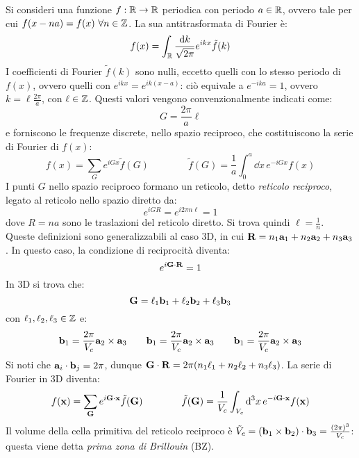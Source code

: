 Si consideri una funzione $ f : \mathbb{R} \rightarrow \mathbb{R} $ periodica con periodo $ a \in \mathbb{R} $, ovvero tale per cui $ f(x -na) = f(x) \,\,\forall n \in \mathbb{Z} $. La sua antitrasformata di Fourier è:
\begin{equation}
	f(x) = \int_{\mathbb{R}} \frac{\mathrm{d} k}{\sqrt{2\pi}} e^{ikx} \tilde{f}(k)
\end{equation}
I coefficienti di Fourier $ \tilde{f}(k) $ sono nulli, eccetto quelli con lo stesso periodo di $ f(x) $, ovvero quelli con $ e^{ikx} = e^{ik(x-a)} $: ciò equivale a $ e^{-ika} = 1 $, ovvero $ k = \ell \frac{2\pi}{a} $, con $ \ell \in \mathbb{Z} $. Questi valori vengono convenzionalmente indicati come:
\begin{equation}
	G = \frac{2\pi}{a} \ell
\end{equation}
e forniscono le frequenze discrete, nello spazio reciproco, che costituiscono la serie di Fourier di $ f(x) $:
\begin{equation}
	f(x) = \sum_G e^{iGx} \tilde{f}(G)
	\qquad \qquad
	\tilde{f}(G) = \frac{1}{a} \int_0^a \dd x\, e^{-i G x} f(x)
\end{equation}
I punti $ G $ nello spazio reciproco formano un reticolo, detto \textit{reticolo reciproco}, legato al reticolo nello spazio diretto da:
\begin{equation}
	e^{i G R} = e^{i 2\pi n \ell} = 1
\end{equation}
dove $ R = na $ sono le traslazioni del reticolo diretto. Si trova quindi $ \ell = \frac{1}{n} $. \\
Queste definizioni sono generalizzabili al caso 3D, in cui $ \mathbf{R} = n_1 \mathbf{a}_1 + n_2 \mathbf{a}_2 + n_3 \mathbf{a}_3 $. In questo caso, la condizione di reciprocità diventa:
\begin{equation}
	e^{i \mathbf{G} \cdot \mathbf{R}} = 1
	\label{eq:rec-ret}
\end{equation}
In 3D si trova che:
\begin{equation}
	\mathbf{G} = \ell_1 \mathbf{b}_1 + \ell_2 \mathbf{b}_2 + \ell_3 \mathbf{b}_3
\end{equation}
con $ \ell_1, \ell_2, \ell_3 \in \mathbb{Z} $ e:
\begin{equation}
	\mathbf{b}_1 = \frac{2\pi}{V_c} \mathbf{a}_2 \times \mathbf{a}_3
	\qquad
	\mathbf{b}_1 = \frac{2\pi}{V_c} \mathbf{a}_2 \times \mathbf{a}_3
	\qquad
	\mathbf{b}_1 = \frac{2\pi}{V_c} \mathbf{a}_2 \times \mathbf{a}_3
\end{equation}
Si noti che $ \mathbf{a}_i \cdot \mathbf{b}_j = 2\pi $, dunque $ \mathbf{G} \cdot \mathbf{R} = 2\pi (n_1 \ell_1 + n_2 \ell_2 + n_3 \ell_3) $. La serie di Fourier in 3D diventa:
\begin{equation}
	f(\mathbf{x}) = \sum_{\mathbf{G}} e^{i \mathbf{G} \cdot \mathbf{x}} \tilde{f}(\mathbf{G})
	\qquad \qquad
	\tilde{f}(\mathbf{G}) = \frac{1}{V_c} \int_{V_c} \mathrm{d}^3x\, e^{-i \mathbf{G} \cdot \mathbf{x}} f(\mathbf{x})
\end{equation}
Il volume della cella primitiva del reticolo reciproco è $ \tilde{V}_c = (\mathbf{b}_1 \times \mathbf{b}_2) \cdot \mathbf{b}_3 = \frac{(2\pi)^3}{V_c} $: questa viene detta \textit{prima zona di Brillouin} (BZ).

